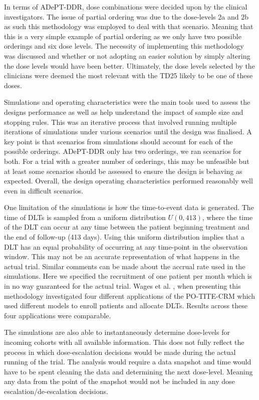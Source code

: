 In terms of ADePT-DDR, dose combinations were decided upon by the clinical investigators. The issue of partial ordering was due to the dose-levels 2a and 2b as such this methodology was employed to deal with that scenario. Meaning that this is a very simple example of partial ordering as we only have two possible orderings and six dose levels. The necessity of implementing this methodology was discussed and whether or not adopting an easier solution by simply altering the dose levels would have been better. Ultimately, the dose levels selected by the clinicians were deemed the most relevant with the TD25 likely to be one of these doses.     
 
Simulations and operating characteristics were the main tools used to assess the designs performance as well as help understand the impact of sample size and stopping rules. This was an iterative process that involved running multiple iterations of simulations under various scenarios until the design was finalised. A key point is that scenarios from simulations should account for each of the possible orderings. ADePT-DDR only has two orderings, we ran scenarios for both. For a trial with a greater number of orderings, this may be unfeasible but at least some scenarios should be assessed to ensure the design is behaving as expected. Overall, the design operating characteristics performed reasonably well even in difficult scenarios. 

One limitation of the simulations is how the time-to-event data is generated. The time of DLTs is sampled from a uniform distribution $U(0, 413)$, where the time of the DLT can occur at any time between the patient beginning treatment and the end of follow-up (413 days). Using this uniform distribution implies that a DLT has an equal probability of occurring at any time-point in the observation window. This may not be an accurate representation of what happens in the actual trial. Similar comments can be made about the accrual rate used in the simulations. Here we specified the recruitment of one patient per month which is in no way guaranteed for the actual trial. Wages et al. \cite{wagesUsingTimetoeventContinual2013}, when presenting this methodology investigated four different applications of the PO-TITE-CRM which used different models to enroll patients and allocate DLTs. Results across these four applications were comparable. 

The simulations are also able to instantaneously determine dose-levels for incoming cohorts with all available information. This does not fully reflect the process in which dose-escalation decisions would be made during the actual running of the trial. The analysis would require a data snapshot and time would have to be spent cleaning the data and determining the next dose-level. Meaning any data from the point of the snapshot would not be included in any dose escalation/de-escalation decisions. 

